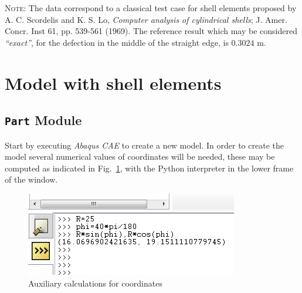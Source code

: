 \documentclass[english,a4paper,12pt]{article}
\begin{document}
\textsc{Note:} The data correspond to a classical test case for shell elements proposed by A. C. Scordelis and K. S. Lo, \emph{Computer analysis of cylindrical shells}; J. Amer. Concr. Inst 61, pp. 539-561 (1969).
The reference result which may be considered \emph{``exact''}, for the defection in the middle of the straight edge, is $0.3024$ m.


\section{Model with shell elements}
\label{sec:guia}

\subsection{\texttt{Part} Module}

Start by executing \emph{Abaqus CAE} to create a new model.
In order to create the model several numerical values of coordinates will be needed, these may be computed as indicated in Fig.~\ref{fig:python}, with the Python interpreter in the lower frame of the window.
\begin{figure}[h!tbp]
\begin{center}\includegraphics[scale=0.5]{capturas/01-python-calculos-aux.png}\end{center}
\caption{Auxiliary calculations for coordinates}
\label{fig:python}
\end{figure}
\end{document}

